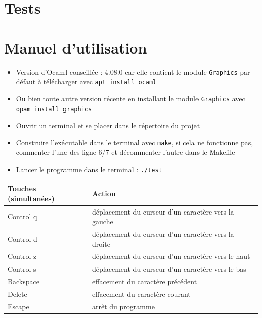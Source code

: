 \documentclass[a4paper,12pt]{article}
\begin{document}
\section{Tests}

\section{Manuel d'utilisation}
\begin {itemize}
    \item Version d'Ocaml conseillée : 4.08.0 car elle contient le module \texttt{Graphics} par défaut à télécharger avec \texttt{apt install ocaml} 
    \item Ou bien toute autre version récente en installant le module \texttt{Graphics} avec \texttt{opam install graphics}
    \item Ouvrir un terminal et se placer dans le répertoire du projet
    \item Construire l'exécutable dans le terminal avec \texttt{make}, si cela ne fonctionne pas, commenter l'une des ligne 6/7 et décommenter l'autre dans le Makefile
    \item Lancer le programme dans le terminal : \texttt{./test}
\end{itemize}

\begin{table}[htbp]
  \centering
  \begin{tabular}{|l|l|}
  \hline
  Touches (simultanées) & Action \\
  \hline
  Control q & déplacement du curseur d'un caractère vers la gauche \\
  \hline
  Control d & déplacement du curseur d'un caractère vers la droite \\
  \hline
  Control z & déplacement du curseur d'un caractère vers le haut \\
  \hline
  Control s & déplacement du curseur d'un caractère vers le bas \\
  \hline
  Backspace & effacement du caractère précédent \\
  \hline
  Delete & effacement du caractère courant \\
  \hline
  Escape & arrêt du programme \\
  \hline
  \end{tabular}
\end{table}
\end{document}
